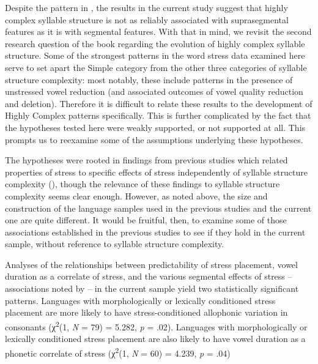   Despite the pattern in , the results in the current study suggest that highly complex syllable structure is not as reliably associated with suprasegmental features as it is with segmental features. With that in mind, we revisit the second research question of the book regarding the evolution of highly complex syllable structure. Some of the strongest patterns in the word stress data examined here serve to set apart the Simple category from the other three categories of syllable structure complexity: most notably, these include patterns in the presence of unstressed vowel reduction (and associated outcomes of vowel quality reduction and deletion). Therefore it is difficult to relate these results to the development of Highly Complex patterns specifically. This is further complicated by the fact that the hypotheses tested here were weakly supported, or not supported at all. This prompts us to reexamine some of the assumptions underlying these hypotheses.

  The hypotheses were rooted in findings from previous studies which related properties of stress to specific effects of stress independently of syllable structure complexity (\citealt{BybeeEtAl1998,Schiering2007}), though the relevance of these findings to syllable structure complexity seems clear enough. However, as noted above, the size and construction of the language samples used in the previous studies and the current one are quite different. It would be fruitful, then, to examine some of those associations established in the previous studies to see if they hold in the current sample, without reference to syllable structure complexity.

  Analyses of the relationships between predictability of stress placement, vowel duration as a correlate of stress, and the various segmental effects of stress -- associations noted by \citet{BybeeEtAl1998} -- in the current sample yield two statistically significant patterns. Languages with morphologically or lexically conditioned stress placement are more likely to have stress-conditioned allophonic variation in consonants (χ\textsuperscript{2}(1, \textit{N} = 79) = 5.282, \textit{p} = .02). Languages with morphologically or lexically conditioned stress placement are also likely to have vowel duration as a phonetic correlate of stress (χ\textsuperscript{2}(1, \textit{N} = 60) = 4.239, \textit{p} = .04)

